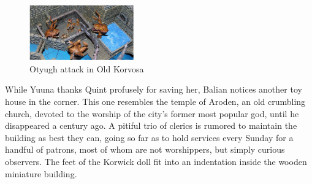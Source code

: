 \begin{figure}[h]
	\centering
	\includegraphics[width=0.4\textwidth]{images/Otyugh-attack-in-Old-Korvosa-550450012_mod.jpg}
	\caption{Otyugh attack in Old Korvosa}
	\label{fig:Otyugh-attack-in-Old-Korvosa-550450012}
\end{figure}

While Yuuna thanks Quint profusely for saving her, Balian notices another toy house in the corner. This one resembles the temple of Aroden, an old crumbling church, devoted to the worship of the city's former most popular god, until he disappeared a century ago. A pitiful trio of clerics is rumored to maintain the building as best they can, going so far as to hold services every Sunday for a handful of patrons, most of whom are not worshippers, but simply curious observers. The feet of the Korwick doll fit into an indentation inside the wooden miniature building.\\

